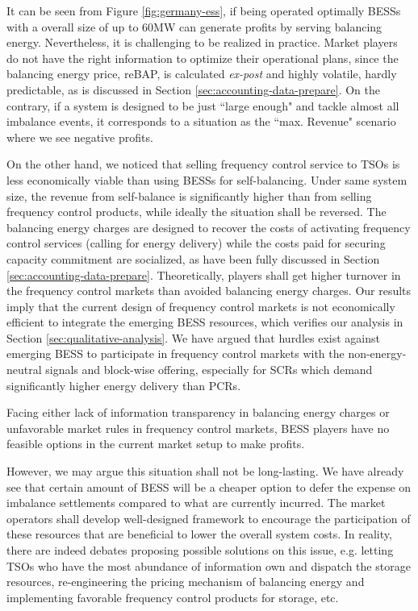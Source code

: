 It can be seen from Figure \ref{fig:germany-ess}, if being operated optimally BESSs with a overall size of up to 60MW can generate profits by serving balancing energy. Nevertheless, it is challenging to be realized in practice. Market players do not have the right information to optimize their operational plans, since the balancing energy price, reBAP, is calculated \textit{ex-post} and highly volatile, hardly predictable, as is discussed in Section \ref{sec:accounting-data-prepare}. On the contrary, if a system is designed to be just ``large enough" and tackle almost all imbalance events, it corresponds to a situation as the ``max. Revenue" scenario where we see negative profits.

On the other hand, we noticed that selling frequency control service to TSOs is less economically viable than using BESSs for self-balancing. Under same system size, the revenue from self-balance is significantly higher than from selling frequency control products, while ideally the situation shall be reversed. The balancing energy charges are designed to recover the costs of activating frequency control services (calling for energy delivery) while the costs paid for securing capacity commitment are socialized, as have been fully discussed in Section \ref{sec:accounting-data-prepare}. Theoretically, players shall get higher turnover in the frequency control markets than avoided balancing energy charges. Our results imply that the current design of frequency control markets is not economically efficient to integrate the emerging BESS resources, which verifies our analysis in Section \ref{sec:qualitative-analysis}. We have argued that hurdles exist against emerging BESS to participate in frequency control markets with the non-energy-neutral signals and block-wise offering, especially for SCRs which demand significantly higher energy delivery than PCRs.

Facing either lack of information transparency in balancing energy charges or unfavorable market rules in frequency control markets, BESS players have no feasible options in the current market setup to make profits.

However, we may argue this situation shall not be long-lasting. We have already see that certain amount of BESS will be a cheaper option to defer the expense on imbalance settlements compared to what are currently incurred. The market operators shall develop well-designed framework to encourage the participation of these resources that are beneficial to lower the overall system costs. In reality, there are indeed debates proposing possible solutions on this issue, e.g. letting TSOs who have the most abundance of information own and dispatch the storage resources\cite{He2012}, re-engineering the pricing mechanism of balancing energy\cite{Wartsila2014} and implementing favorable frequency control products for storage\cite{Megel2017}, etc.

